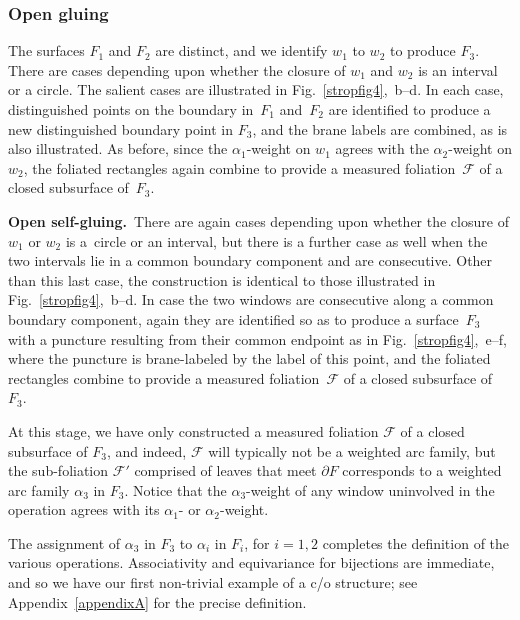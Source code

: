 \documentclass[pdftex]{sigma}
\begin{document}
\subsubsection{Open gluing}

The surfaces $F_1$ and $F_2$ are distinct, and we identify $w_1$ to $w_2$ to produce
$F_3$.
There are cases depending upon whether the closure of $w_1$ and $w_2$ is an interval or a circle.  The salient
cases are
illustrated in Fig.~\ref{stropfig4},~b--d.  In each case,  distinguished points on the boundary in~$F_1$ and~$F_2$ are
identif\/ied to produce a new distinguished boundary point in $F_3$, and the brane labels are combined, as is also
illustrated.  As before, since the
$\alpha _1$-weight on $w_1$ agrees with the $\alpha _2$-weight on $w_2$, the foliated rectangles again combine to
provide a measured foliation~${\mathcal F}$ of a closed subsurface of~$F_3$.

 {\bf Open self-gluing.}~There are again cases depending upon whether the closure of $w_1$ or $w_2$ is a~circle or an interval, but there is a further case as well when the two intervals lie in a common boundary component
and
are consecutive.  Other than this last case, the construction is identical to those illustrated
in Fig.~\ref{stropfig4},~b--d.  In case the two windows are consecutive along a common boundary component, again they are identif\/ied
so
as to produce a surface~$F_3$ with a puncture resulting from their common endpoint as in Fig.~\ref{stropfig4},~e--f, where the
puncture is
brane-labeled by the label of this point, and the foliated rectangles combine to provide a measured foliation~${\mathcal F}$ of a closed subsurface of~$F_3$.



At this stage, we have only constructed a measured foliation ${\mathcal F}$ of a closed subsurface of $F_3$, and
indeed,
${\mathcal F}$ will typically not be a weighted arc family, but the sub-foliation
${\mathcal
F}'$ comprised of leaves that meet $\partial F$ corresponds to a weighted arc family $\alpha _3$ in $F_3$.
Notice that
the $\alpha _3$-weight of any window uninvolved in the operation agrees with its $\alpha _1$- or $\alpha _2$-weight.

The assignment of $\alpha_3$ in $F_3$ to $\alpha _i$ in $F_i$, for
$i=1,2$ completes the def\/inition of the various operations.
Associativity and equivariance for bijections are immediate, and so
we have our f\/irst non-trivial example of a c/o structure; see
Appendix~\ref{appendixA} for the precise def\/inition.
\end{document}
